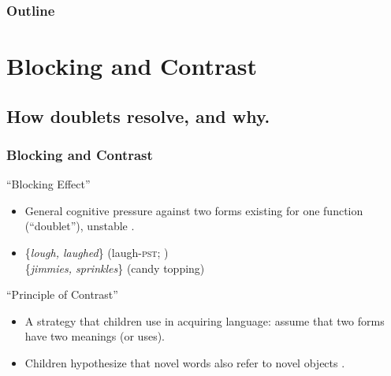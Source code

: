\documentclass[hyperref={pdfpagelabels=false}]{beamer}
\begin{document}
\begin{frame}
\frametitle{Outline}
\tableofcontents
\end{frame}


\section{Blocking and Contrast}
\subsection{How doublets resolve, and why.}
\begin{frame}
\frametitle{Blocking and Contrast}
\begin{block}{``Blocking Effect'' \citep{aronoff1976}}
	\begin{itemize}
		\item General cognitive pressure against two forms existing for one function (``doublet''), unstable \citep{kroch1994}.
		\item[ ]\{\textsl{lough, laughed}\} (laugh-\textsc{pst}; \citealt{taylor1994}) \\ \{\textsl{jimmies, sprinkles}\} (candy topping)
	\end{itemize}
\end{block}
\begin{block}{``Principle of Contrast''}
	\begin{itemize}
		\item A strategy that children use in acquiring language: assume that two forms have two meanings (or uses)\citep[][{ \it inter alia}]{clark1987, clark1990}.
		\item Children hypothesize that novel words also refer to novel objects \citep[as in][among many other replications of the effect]{markmanwachtel1988}.
	\end{itemize}
\end{block}
\end{frame}
\end{document}
